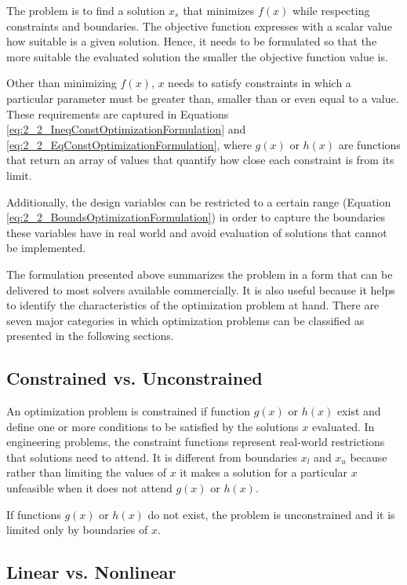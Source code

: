 The problem is to find a solution $x_s$ that minimizes $f(x)$ while respecting constraints and boundaries. The objective function expresses with a scalar value how suitable is a given solution. Hence, it needs to be formulated so that the more suitable the evaluated solution the smaller the objective function value is. 

Other than minimizing $f(x)$, $x$ needs to satisfy constraints in which a particular parameter must be greater than, smaller than or even equal to a value. These requirements are captured in Equations \ref{eq:2_2_IneqConstOptimizationFormulation} and \ref{eq:2_2_EqConstOptimizationFormulation}, where $g(x)$ or $h(x)$ are functions that return an array of values that quantify how close each constraint is from its limit. 

Additionally, the design variables can be restricted to a certain range (Equation \ref{eq:2_2_BoundsOptimizationFormulation}) in order to capture the boundaries these variables have in real world and avoid evaluation of solutions that cannot be implemented.

The formulation presented above summarizes the problem in a form that can be delivered to most solvers available commercially. It is also useful because it helps to identify the characteristics of the optimization problem at hand. There are seven major categories in which optimization problems can be classified \cite{Messac} as presented in the following sections.

\subsection{Constrained vs. Unconstrained}

An optimization problem is constrained if function $g(x)$ or $h(x)$ exist and define one or more conditions to be satisfied by the solutions $x$ evaluated. In engineering problems, the constraint functions represent real-world restrictions that solutions need to attend. It is different from boundaries $x_l$ and $x_u$ because rather than limiting the values of $x$ it makes a solution for a particular $x$ unfeasible when it does not attend $g(x)$ or $h(x)$.

If functions $g(x)$ or $h(x)$ do not exist, the problem is unconstrained and it is limited only by boundaries of $x$.

\subsection{Linear vs. Nonlinear}

